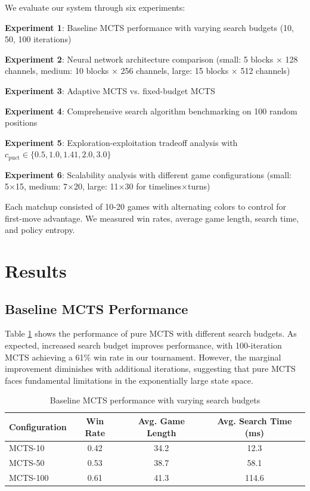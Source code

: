 \documentclass{article}
\begin{document}
We evaluate our system through six experiments:

\textbf{Experiment 1}: Baseline MCTS performance with varying search budgets (10, 50, 100 iterations)

\textbf{Experiment 2}: Neural network architecture comparison (small: 5 blocks × 128 channels, medium: 10 blocks × 256 channels, large: 15 blocks × 512 channels)

\textbf{Experiment 3}: Adaptive MCTS vs. fixed-budget MCTS

\textbf{Experiment 4}: Comprehensive search algorithm benchmarking on 100 random positions

\textbf{Experiment 5}: Exploration-exploitation tradeoff analysis with $c_{\text{puct}} \in \{0.5, 1.0, 1.41, 2.0, 3.0\}$

\textbf{Experiment 6}: Scalability analysis with different game configurations (small: 5×15, medium: 7×20, large: 11×30 for timelines×turns)

Each matchup consisted of 10-20 games with alternating colors to control for first-move advantage. We measured win rates, average game length, search time, and policy entropy.

\section{Results}

\subsection{Baseline MCTS Performance}

Table \ref{tab:baseline} shows the performance of pure MCTS with different search budgets. As expected, increased search budget improves performance, with 100-iteration MCTS achieving a 61\% win rate in our tournament. However, the marginal improvement diminishes with additional iterations, suggesting that pure MCTS faces fundamental limitations in the exponentially large state space.

\begin{table}[h]
\centering
\caption{Baseline MCTS performance with varying search budgets}
\label{tab:baseline}
\begin{tabular}{lccc}
\toprule
Configuration & Win Rate & Avg. Game Length & Avg. Search Time (ms) \\
\midrule
MCTS-10 & 0.42 & 34.2 & 12.3 \\
MCTS-50 & 0.53 & 38.7 & 58.1 \\
MCTS-100 & 0.61 & 41.3 & 114.6 \\
\bottomrule
\end{tabular}
\end{table}
\end{document}
